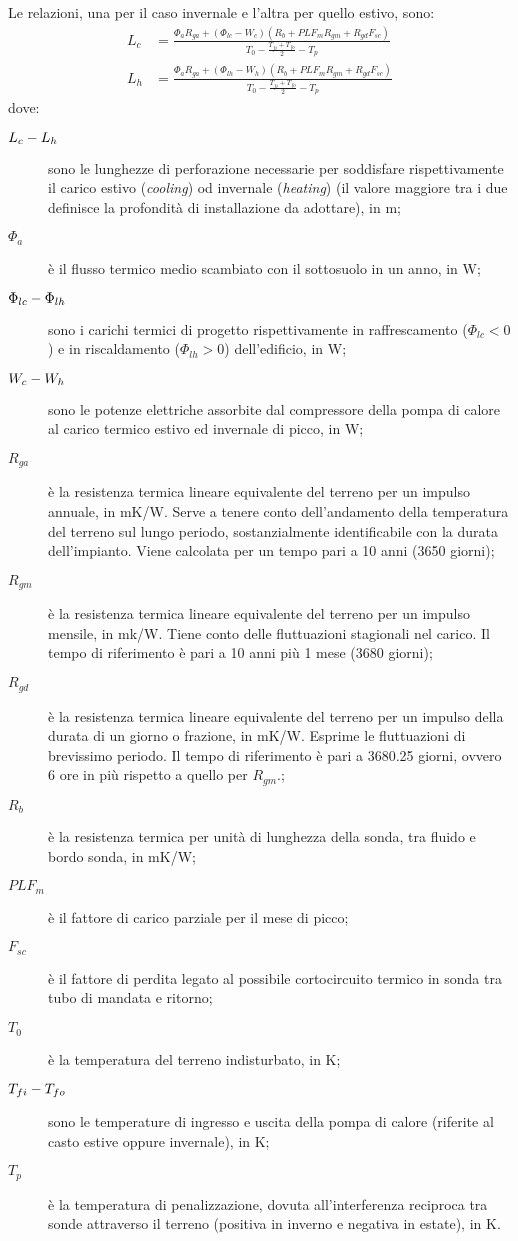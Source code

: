 Le relazioni, una per il caso invernale e l'altra per quello estivo, sono:
\begin{align}
	L_c&= \frac{\Phi_a R_{ga}+(\Phi_{lc}-W_{c})(R_b+PLF_mR_{gm}+R_{gd}F_{sc})}{T_0-\frac{T_{fi}+T_{fo}}{2}-T_p}\\
	L_h&= \frac{\Phi_a R_{ga}+(\Phi_{lh}-W_{h})(R_b+PLF_mR_{gm}+R_{gd}F_{sc})}{T_0-\frac{T_{fi}+T_{fo}}{2}-T_p}
\end{align}
dove:
\begin{description}
	\item[$L_c \-- L_h$] sono le lunghezze di perforazione necessarie per soddisfare rispettivamente il carico estivo (\emph{cooling}) od invernale (\emph{heating}) (il valore maggiore tra i due definisce la profondità di installazione da adottare), in \si{m};
	\item[$\Phi_a$] è il flusso termico medio scambiato con il sottosuolo in un anno, in \si{W};
	\item[$\Phi_{lc} \-- \Phi_{lh}$] sono i carichi termici di progetto rispettivamente in raffrescamento ($\Phi_{lc}<0$) e in riscaldamento ($\Phi_{lh}>0$) dell'edificio, in \si{W};
	\item[$W_c \-- W_h$] sono le potenze elettriche assorbite dal compressore della pompa di calore al carico termico estivo ed invernale di picco, in \si{W};
	\item[$R_{ga}$] è la resistenza termica lineare equivalente del terreno per un impulso annuale, in \si{mK/W}. Serve a tenere conto dell'andamento della temperatura del terreno sul lungo periodo, sostanzialmente identificabile con la durata dell'impianto. Viene calcolata per un tempo pari a \num{10} anni (\num{3650} giorni);
	\item[$R_{gm}$] è la resistenza termica lineare equivalente del terreno per un impulso mensile, in \si{mk/W}. Tiene conto delle fluttuazioni stagionali nel carico. Il tempo di riferimento è pari a \num{10} anni più \num{1} mese (\num{3680} giorni);
	\item[$R_{gd}$] è la resistenza termica lineare equivalente del terreno per un impulso della durata di un giorno o frazione, in \si{mK/W}. Esprime le fluttuazioni di brevissimo periodo. Il tempo di riferimento è pari a \num{3680.25} giorni, ovvero \num{6} ore in più rispetto a quello per $R_{gm}$.;
	\item[$R_b$] è la resistenza termica per unità di lunghezza della sonda, tra fluido e bordo sonda, in \si{mK/W};
	\item[$PLF_m$] è il fattore di carico parziale per il mese di picco;
	\item[$F_{sc}$] è il fattore di perdita legato al possibile cortocircuito termico in sonda tra tubo di mandata e ritorno;
	\item[$T_0$] è la temperatura del terreno indisturbato, in \si{K};
	\item[$T_{fi} \-- T_{fo}$] sono le temperature di ingresso e uscita della pompa di calore (riferite al casto estive oppure invernale), in \si{K};
	\item[$T_p$] è la temperatura di penalizzazione, dovuta all'interferenza reciproca tra sonde attraverso il terreno (positiva in inverno e negativa in estate), in \si{K}.
\end{description}
